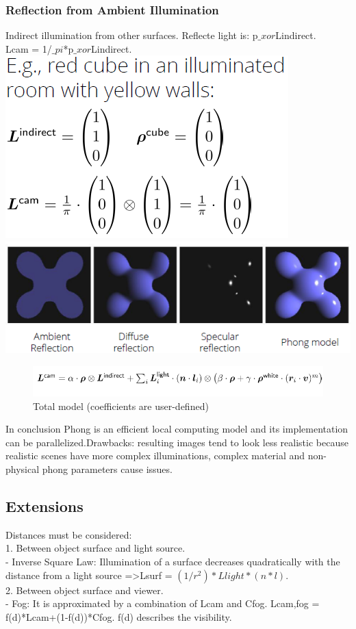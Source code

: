 \documentclass{article}
\begin{document}
\subsubsection{Reflection from Ambient Illumination}
Indirect illumination from other surfaces. Reflecte light is: p$\_xor$Lindirect.\\
Lcam = 1/$\_pi$*p$\_xor$Lindirect.
\includegraphics[scale=0.6]{image18.png}
\includegraphics[scale=0.6]{image19.png}\\
\begin{figure}
\includegraphics[scale=0.6]{image20.png}
\caption{Total model (coefficients are user-defined)}
\end{figure}
In conclusion Phong is an efficient local computing model and its implementation can be parallelized.Drawbacks: resulting images tend to look less realistic because realistic scenes have more complex illuminations, complex material and non-physical phong parameters cause issues.\\

\subsection{Extensions}
Distances must be considered:\\
1. Between object surface and light source.\\
- Inverse Square Law: Illumination of a surface decreases quadratically with the distance from a light source =\textgreater Lsurf = $(1/r^2)*Llight*(n*l)$.\\
2. Between object surface and viewer.\\
- Fog: It is approximated by a combination of Lcam and Cfog. Lcam,fog = f(d)*Lcam+(1-f(d))*Cfog. f(d) describes the visibility.
\end{document}
